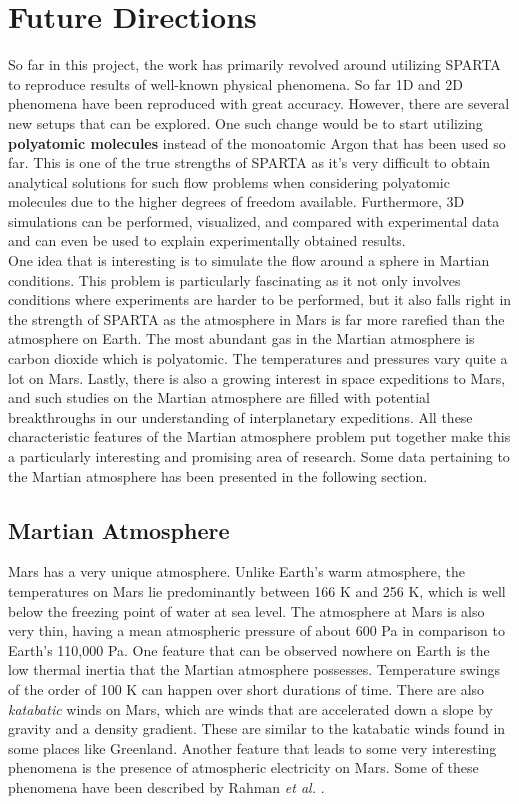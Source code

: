 \newpage

\chapter{Future Directions}

So far in this project, the work has primarily revolved around utilizing SPARTA to reproduce results of well-known physical phenomena. So far 1D and 2D phenomena have been reproduced with great accuracy. However, there are several new setups that can be explored. One such change would be to start utilizing \textbf{polyatomic molecules} instead of the monoatomic Argon that has been used so far. This is one of the true strengths of SPARTA as it's very difficult to obtain analytical solutions for such flow problems when considering polyatomic molecules due to the higher degrees of freedom available. Furthermore, 3D simulations can be performed, visualized, and compared with experimental data and can even be used to explain experimentally obtained results. \\

\no One idea that is interesting is to simulate the flow around a sphere in Martian conditions. This problem is particularly fascinating as it not only involves conditions where experiments are harder to be performed, but it also falls right in the strength of SPARTA as the atmosphere in Mars is far more rarefied than the atmosphere on Earth. The most abundant gas in the Martian atmosphere is carbon dioxide which is polyatomic. The temperatures and pressures vary quite a lot on Mars.  Lastly, there is also a growing interest in space expeditions to Mars, and such studies on the Martian atmosphere are filled with potential breakthroughs in our understanding of interplanetary expeditions. All these characteristic features of the Martian atmosphere problem put together make this a particularly interesting and promising area of research. Some data pertaining to the Martian atmosphere has been presented in the following section.

\section{Martian Atmosphere}

Mars has a very unique atmosphere. Unlike Earth's warm atmosphere, the temperatures on Mars lie predominantly between 166 K and 256 K, which is well below the freezing point of water at sea level. The atmosphere at Mars is also very thin, having a mean atmospheric pressure of about 600 Pa in comparison to Earth's 110,000 Pa. One feature that can be observed nowhere on Earth is the low thermal inertia that the Martian atmosphere possesses. Temperature swings of the order of 100 K can happen over short durations of time. There are also \textit{katabatic} winds on Mars, which are winds that are accelerated down a slope by gravity and a density gradient. These are similar to the katabatic winds found in some places like Greenland. Another feature that leads to some very interesting phenomena is the presence of atmospheric electricity on Mars. Some of these phenomena have been described by Rahman \textit{et al.} \cite{rahman2023turbulence}.

